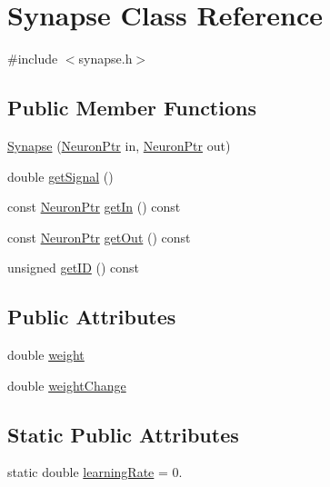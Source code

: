 \hypertarget{class_synapse}{}\section{Synapse Class Reference}
\label{class_synapse}


{\ttfamily \#include $<$synapse.\+h$>$}

\subsection*{Public Member Functions}
\begin{DoxyCompactItemize}
\item 
\hyperlink{class_synapse_ad7d17e64c370f530debc6755ff39c866}{Synapse} (\hyperlink{neural_network_8h_af4884b0194f2598e689c894b76d0d92c}{Neuron\+Ptr} in, \hyperlink{neural_network_8h_af4884b0194f2598e689c894b76d0d92c}{Neuron\+Ptr} out)
\item 
double \hyperlink{class_synapse_af46174272161c65aa44279c92f8e625b}{get\+Signal} ()
\item 
const \hyperlink{neural_network_8h_af4884b0194f2598e689c894b76d0d92c}{Neuron\+Ptr} \hyperlink{class_synapse_ac6f0d40b4c56391f6eaf17c062112089}{get\+In} () const
\item 
const \hyperlink{neural_network_8h_af4884b0194f2598e689c894b76d0d92c}{Neuron\+Ptr} \hyperlink{class_synapse_a98bb7ae4e2b75edfd07f1366cba6cc80}{get\+Out} () const
\item 
unsigned \hyperlink{class_synapse_a82879d96c983b1a788c69f8144bd3095}{get\+ID} () const
\end{DoxyCompactItemize}
\subsection*{Public Attributes}
\begin{DoxyCompactItemize}
\item 
double \hyperlink{class_synapse_a44d98296097d0130667a45ee2645fe2b}{weight}
\item 
double \hyperlink{class_synapse_a6346dada19b7ff4cd5a20764e07665c3}{weight\+Change}
\end{DoxyCompactItemize}
\subsection*{Static Public Attributes}
\begin{DoxyCompactItemize}
\item 
static double \hyperlink{class_synapse_a1ea4d11c389bcf1e090c5f74c7c3f9ac}{learning\+Rate} = 0.
\end{DoxyCompactItemize}


